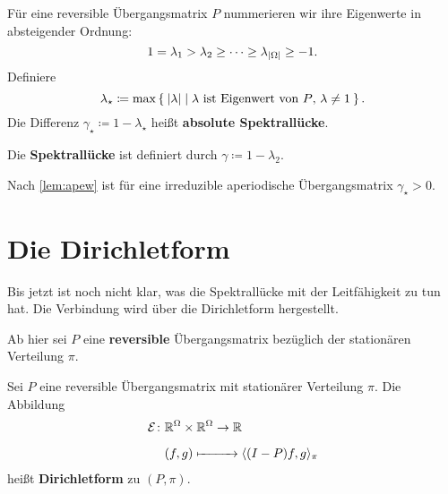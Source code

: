 \documentclass[ngerman,a4paper,11pt]{scrartcl}
\newcommand{\diri}{\mathcal{E}}
\newcommand{\RR}{\mathbb{R}}
\DeclarePairedDelimiter{\sprod}{\langle}{\rangle}	%
\DeclarePairedDelimiter{\abs}{\lvert}{\rvert}		%
\begin{document}
\begin{defn}
 Für eine reversible Übergangsmatrix $P$ nummerieren wir ihre Eigenwerte in
 absteigender Ordnung:
 \begin{equation*}
  1=\lambda_1>\lambda_2\geq\dotsb\geq\lambda_{\abs{\Omega}}\geq -1.
 \end{equation*}
 Definiere
 \begin{equation*}
  \lambda_\star\coloneqq\max\Set{\abs{\lambda}\mid\text{$\lambda$ ist Eigenwert von $P$, $\lambda\neq 1$}}. 
 \end{equation*}
  Die Differenz $\gamma_\star\coloneqq 1-\lambda_\star$ heißt \textbf{absolute Spektrallücke}.

  Die \textbf{Spektrallücke} ist definiert durch $\gamma\coloneqq 1-\lambda_2$.
\end{defn}

\begin{rem}
 Nach \cref{lem:apew} ist für eine irreduzible aperiodische Übergangsmatrix $\gamma_\star>0$. 
\end{rem}

\section{Die Dirichletform}
Bis jetzt ist noch nicht klar, was die Spektrallücke mit der Leitfähigkeit zu
tun hat. Die Verbindung wird über die Dirichletform hergestellt.

Ab hier sei $P$ eine \textbf{reversible} Übergangsmatrix bezüglich der
stationären Verteilung $\pi$.

\begin{defn}
  Sei $P$ eine reversible Übergangsmatrix mit stationärer Verteilung $\pi$. Die Abbildung
  \begin{align*}
   \diri \colon &\RR^\Omega\times\RR^\Omega \to\RR \\
   &(f,g)\xmapsto{\phantom{\RR^\Omega\times\RR^\Omega}}\sprod{(I-P)f,g}_\pi
  \end{align*}
  heißt \textbf{Dirichletform} zu $(P,\pi)$.
\end{defn}
\end{document}
